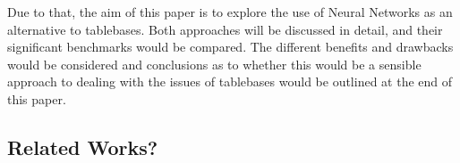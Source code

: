 Due to that, the aim of this paper is to explore the use of Neural Networks as an alternative to tablebases. Both approaches will be discussed in detail, and their significant benchmarks would be compared. The different benefits and drawbacks would be considered and conclusions as to whether this would be a sensible approach to dealing with the issues of tablebases would be outlined at the end of this paper.
\subsection{Related Works?}